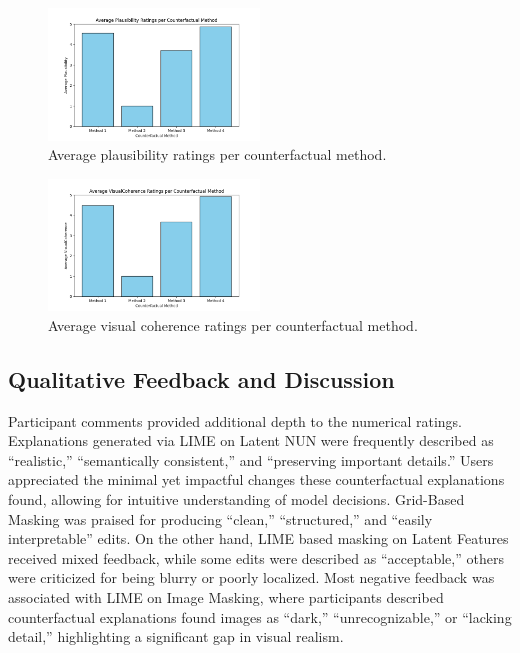 \begin{figure}[h]
    \centering
    \includegraphics[width=0.5\textwidth]{img/human_rating_results/Plausibility_ratings.png}
    \caption{Average plausibility ratings per counterfactual method.}
    \label{fig:cf_plausibility}
\end{figure}

\begin{figure}[h]
    \centering
    \includegraphics[width=0.5\textwidth]{img/human_rating_results/VisualCoherence_ratings.png}
    \caption{Average visual coherence ratings per counterfactual method.}
    \label{fig:cf_visualcoherence}
\end{figure}

\vspace{0.5em}
\subsection{Qualitative Feedback and Discussion}
Participant comments provided additional depth to the numerical ratings. Explanations generated via LIME on Latent NUN were frequently described as “realistic,” “semantically consistent,” and “preserving important details.” Users appreciated the minimal yet impactful changes these counterfactual explanations found, allowing for intuitive understanding of model decisions. Grid-Based Masking was praised for producing “clean,” “structured,” and “easily interpretable” edits. On the other hand, LIME based masking on Latent Features received mixed feedback, while some edits were described as “acceptable,” others were criticized for being blurry or poorly localized. Most negative feedback was associated with LIME on Image Masking, where participants described counterfactual explanations found images as “dark,” “unrecognizable,” or “lacking detail,” highlighting a significant gap in visual realism.

